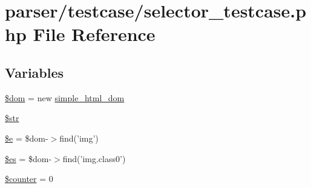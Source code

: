\hypertarget{selector__testcase_8php}{\section{parser/testcase/selector\+\_\+testcase.php File Reference}
\label{selector__testcase_8php}
}
\subsection*{Variables}
\begin{DoxyCompactItemize}
\item 
\hyperlink{selector__testcase_8php_a46127a794280dd592812c25b62af34b0}{\$dom} = new \hyperlink{classsimple__html__dom}{simple\+\_\+html\+\_\+dom}
\item 
\hyperlink{selector__testcase_8php_a7542d95618011800c61773127fa625cf}{\$str}
\item 
\hyperlink{selector__testcase_8php_ab74076a9b7e1d23d12b9e8d65e60315a}{\$e} = \$dom-\/$>$find('img')
\item 
\hyperlink{selector__testcase_8php_a388cbda27103d2baee3997798d1f2744}{\$es} = \$dom-\/$>$find('img.\+class0')
\item 
\hyperlink{selector__testcase_8php_adc0a189fac719187ba2e6f01ca0f2466}{\$counter} = 0
\end{DoxyCompactItemize}


